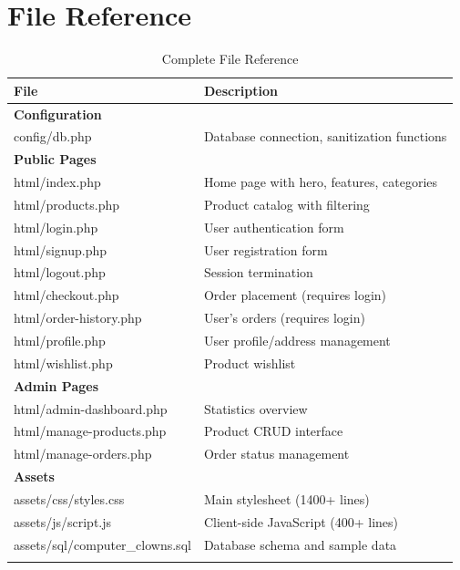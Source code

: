 \documentclass[12pt,a4paper]{article}
\begin{document}
\section{File Reference}

\begin{longtable}{@{}p{4cm}p{10cm}@{}}
\toprule
\textbf{File} & \textbf{Description} \\
\midrule
\endhead

\multicolumn{2}{l}{\textbf{Configuration}} \\
\midrule
config/db.php & Database connection, sanitization functions \\
\midrule

\multicolumn{2}{l}{\textbf{Public Pages}} \\
\midrule
html/index.php & Home page with hero, features, categories \\
html/products.php & Product catalog with filtering \\
html/login.php & User authentication form \\
html/signup.php & User registration form \\
html/logout.php & Session termination \\
html/checkout.php & Order placement (requires login) \\
html/order-history.php & User's orders (requires login) \\
html/profile.php & User profile/address management \\
html/wishlist.php & Product wishlist \\
\midrule

\multicolumn{2}{l}{\textbf{Admin Pages}} \\
\midrule
html/admin-dashboard.php & Statistics overview \\
html/manage-products.php & Product CRUD interface \\
html/manage-orders.php & Order status management \\
\midrule

\multicolumn{2}{l}{\textbf{Assets}} \\
\midrule
assets/css/styles.css & Main stylesheet (1400+ lines) \\
assets/js/script.js & Client-side JavaScript (400+ lines) \\
assets/sql/computer\_clowns.sql & Database schema and sample data \\
\bottomrule

\caption{Complete File Reference}
\end{longtable}
\end{document}

